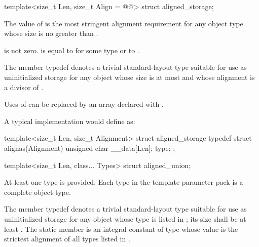 %
\begin{itemdecl}
template<size_t Len, size_t Align = @@>
  struct aligned_storage;
\end{itemdecl}

\begin{itemdescr}
\pnum
The value of  is the most
stringent alignment requirement for any object type whose size
is no greater than .

\pnum
\mandates
{} is not zero.
 is equal to  for some type  or
to .

\pnum
The member typedef  denotes a trivial standard-layout type
suitable for use as uninitialized storage for any object
whose size is at most  and
whose alignment is a divisor of .

\pnum
\begin{note}
Uses of  can be replaced
by an array  declared with .
\end{note}

\pnum
\begin{note}
A typical implementation would define  as:
\begin{codeblock}
template<size_t Len, size_t Alignment>
struct aligned_storage {
  typedef struct {
    alignas(Alignment) unsigned char __data[Len];
  } type;
};
\end{codeblock}
\end{note}

\end{itemdescr}

%
\begin{itemdecl}
template<size_t Len, class... Types>
  struct aligned_union;
\end{itemdecl}

\begin{itemdescr}
\pnum
\mandates
At least one type is provided.
Each type in the template parameter pack 
is a complete object type.

\pnum
The member typedef  denotes a trivial standard-layout type
suitable for use as uninitialized storage for any object
whose type is listed in ;
its size shall be at least .
The static member 
is an integral constant of type 
whose value is the strictest alignment of all types listed in .
\end{itemdescr}


